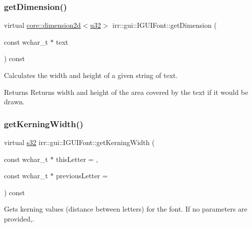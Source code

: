 \subsubsection{\texorpdfstring{get\+Dimension()}{getDimension()}}
{\footnotesize\ttfamily virtual \hyperlink{classirr_1_1core_1_1dimension2d}{core\+::dimension2d}$<$\hyperlink{namespaceirr_a0416a53257075833e7002efd0a18e804}{u32}$>$ irr\+::gui\+::\+I\+G\+U\+I\+Font\+::get\+Dimension (\begin{DoxyParamCaption}\item[{const wchar\+\_\+t $\ast$}]{text }\end{DoxyParamCaption}) const\hspace{0.3cm}{\ttfamily [pure virtual]}}



Calculates the width and height of a given string of text. 

\begin{DoxyReturn}{Returns}
Returns width and height of the area covered by the text if it would be drawn. 
\end{DoxyReturn}
\mbox{\label{classirr_1_1gui_1_1IGUIFont_a7de0b25d3d1dbdcc9036e5d788e2d9ab}} 
\subsubsection{\texorpdfstring{get\+Kerning\+Width()}{getKerningWidth()}}
{\footnotesize\ttfamily virtual \hyperlink{namespaceirr_ac66849b7a6ed16e30ebede579f9b47c6}{s32} irr\+::gui\+::\+I\+G\+U\+I\+Font\+::get\+Kerning\+Width (\begin{DoxyParamCaption}\item[{const wchar\+\_\+t $\ast$}]{this\+Letter = {},  }\item[{const wchar\+\_\+t $\ast$}]{previous\+Letter = {} }\end{DoxyParamCaption}) const\hspace{0.3cm}{\ttfamily [pure virtual]}}



Gets kerning values (distance between letters) for the font. If no parameters are provided,. 

